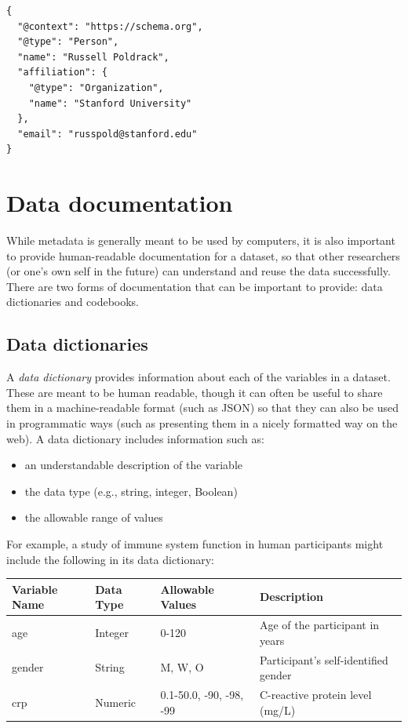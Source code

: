 \begin{lstlisting}[style=json]
{
  "@context": "https://schema.org",
  "@type": "Person",
  "name": "Russell Poldrack",
  "affiliation": {
    "@type": "Organization",
    "name": "Stanford University"
  },
  "email": "russpold@stanford.edu"
}
\end{lstlisting}

\section{Data documentation}

While metadata is generally meant to be used by computers, it is also important to provide human-readable documentation for a dataset, so that other researchers (or one's own self in the future) can understand and reuse the data successfully.  There are two forms of documentation that can be important to provide: data dictionaries and codebooks.

\subsection{Data dictionaries}

A \textit{data dictionary} provides information about each of the variables in a dataset. These are meant to be human readable, though it can often be useful to share them in a machine-readable format (such as JSON) so that they can also be used in programmatic ways (such as presenting them in a nicely formatted way on the web).  A data dictionary includes information such as:

\begin{itemize}
\item an understandable description of the variable
\item the data type (e.g., string, integer, Boolean)
\item the allowable range of values
\end{itemize}

For example, a study of immune system function in human participants might include the following in its data dictionary:

\bigskip\noindent
\begin{tabular}{p{}p{}p{}p{}}
\toprule
Variable Name & Data Type & Allowable Values & Description \\
\hline
age & Integer & 0-120 & Age of the participant in years \\
gender & String & M, W, O & Participant's self-identified gender \\
crp & Numeric & 0.1-50.0, -90, -98, -99 & C-reactive protein level (mg/L) \\
\bottomrule
\end{tabular}

